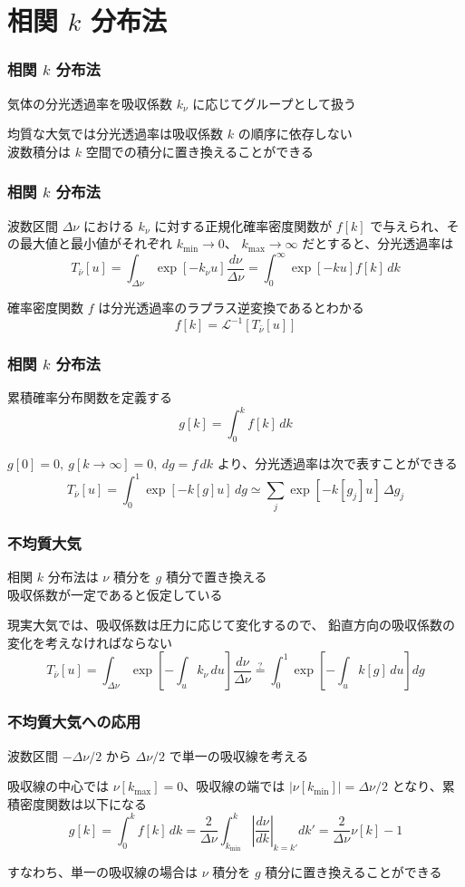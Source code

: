\documentclass[unicode,colorlinks]{beamer}
\begin{document}
\section{相関 $k$ 分布法}

\begin{frame}
	\frametitle{相関 $k$ 分布法}
	気体の分光透過率を吸収係数 $k_\nu$ に応じてグループとして扱う

	均質な大気では分光透過率は吸収係数 $k$ の順序に依存しない\\
	波数積分は $k$ 空間での積分に置き換えることができる
\end{frame}

\begin{frame}
	\frametitle{相関 $k$ 分布法}
	波数区間 $\Delta\nu$ における $k_\nu$ に対する正規化確率密度関数が
	$f[k]$ で与えられ、その最大値と最小値がそれぞれ $k_{\mathrm{min}}\to0$、
	$k_{\mathrm{max}}\to\infty$ だとすると、分光透過率は
	\[T_{\bar\nu}[u]=\int_{\Delta\nu}\exp[-k_\nu u]\frac{d\nu}{\Delta\nu}=\int^\infty_0 \exp[-ku]f[k]\,dk\]

	確率密度関数 $f$ は分光透過率のラプラス逆変換であるとわかる
	\[f[k]=\mathcal{L}^{-1}[T_{\bar\nu}[u]]\]
\end{frame}

\begin{frame}
	\frametitle{相関 $k$ 分布法}
	累積確率分布関数を定義する
	\[g[k]=\int^k_0 f[k]\,dk\]

	$g[0]=0,\ g[k\to\infty]=0,\ dg=f\,dk$ より、分光透過率は次で表すことができる
	\[T_{\bar\nu}[u]=\int^1_0 \exp[-k[g]u]\,dg\simeq\sum_j\exp[-k[g_j]u]\,\Delta g_j\]
\end{frame}

\begin{frame}
	\frametitle{不均質大気}
	相関 $k$ 分布法は $\nu$ 積分を $g$ 積分で置き換える\\
	吸収係数が一定であると仮定している

	現実大気では、吸収係数は圧力に応じて変化するので、
	鉛直方向の吸収係数の変化を考えなければならない
	\[
		T_{\bar\nu}[u]
		=\int_{\Delta\nu}\exp\left[-\int_u k_\nu\,du\right]\frac{d\nu}{\Delta\nu}
		\stackrel{?}{=}\int^1_0\exp\left[-\int_uk[g]\,du\right]dg
	\]
\end{frame}

\begin{frame}
	\frametitle{不均質大気への応用}
	波数区間 $-\Delta\nu/2$ から $\Delta\nu/2$ で単一の吸収線を考える

	吸収線の中心では $\nu[k_{\mathrm{max}}]=0$、吸収線の端では
	$|\nu[k_{\mathrm{min}}]|=\Delta\nu/2$ となり、累積密度関数は以下になる
	\[
		g[k]=\int^k_0 f[k]\,dk
		=\frac{2}{\Delta\nu}\int^k_{k_{\mathrm{min}}}\left|\frac{d\nu}{dk}\right|_{k=k'}dk'
		=\frac{2}{\Delta\nu}\nu[k]-1
	\]

	すなわち、単一の吸収線の場合は $\nu$ 積分を $g$ 積分に置き換えることができる
\end{frame}
\end{document}
